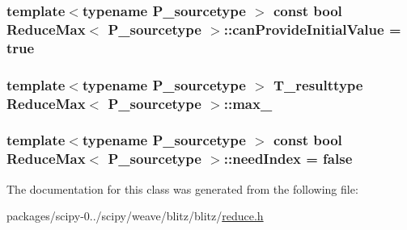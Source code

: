 \subsubsection[{can\+Provide\+Initial\+Value}]{\setlength{\rightskip}{0pt plus 5cm}template$<$typename P\+\_\+sourcetype $>$ const {\bf bool} {\bf Reduce\+Max}$<$ P\+\_\+sourcetype $>$\+::can\+Provide\+Initial\+Value = {\bf true}\hspace{0.3cm}{\ttfamily [static]}}\label{classReduceMax_a335c4053d878c33241d52e7a86656135}
\hypertarget{classReduceMax_a232fc6ca51eddc4f596d9cd6307c7c3d}{}
\subsubsection[{max\+\_\+}]{\setlength{\rightskip}{0pt plus 5cm}template$<$typename P\+\_\+sourcetype $>$ {\bf T\+\_\+resulttype} {\bf Reduce\+Max}$<$ P\+\_\+sourcetype $>$\+::max\+\_\+\hspace{0.3cm}{\ttfamily [protected]}}\label{classReduceMax_a232fc6ca51eddc4f596d9cd6307c7c3d}
\hypertarget{classReduceMax_a1826b9280463d17acf648acbbf255e5e}{}
\subsubsection[{need\+Index}]{\setlength{\rightskip}{0pt plus 5cm}template$<$typename P\+\_\+sourcetype $>$ const {\bf bool} {\bf Reduce\+Max}$<$ P\+\_\+sourcetype $>$\+::need\+Index = {\bf false}\hspace{0.3cm}{\ttfamily [static]}}\label{classReduceMax_a1826b9280463d17acf648acbbf255e5e}


The documentation for this class was generated from the following file\+:\begin{DoxyCompactItemize}
\item 
packages/scipy-\/0../scipy/weave/blitz/blitz/\hyperlink{reduce_8h}{reduce.\+h}\end{DoxyCompactItemize}

